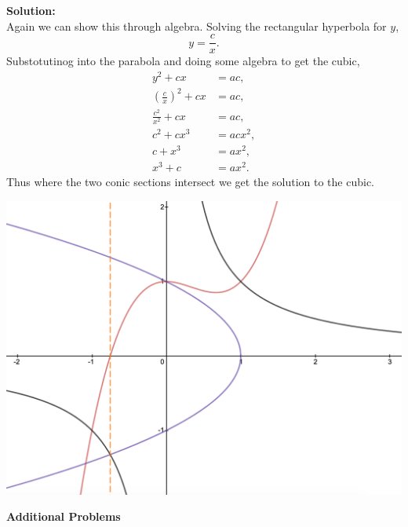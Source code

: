 \documentclass[12pt]{article}
\makeatletter
\theoremstyle{homework}
\newenvironment{exercise}[1]
{\def\@currentlabel{#1}\exercisecore}
{\endexercisecore}
\newcommand{\localhead}[1]{\par\smallskip\noindent\textbf{#1}\nobreak\\}%
\newcommand\solution{\localhead{Solution:}}
\makeatother
\begin{document}
\begin{exercise}{7}
\begin{enumerate}
    \solution Again we can show this through algebra. Solving the rectangular hyperbola for $y$,
    \begin{equation*}
      y = \frac{c}{x}.
    \end{equation*}
    Substotutinog into the parabola and doing some algebra to get the cubic,
    \begin{align*}
      y^2 + cx &= ac,\\
      (\frac{c}{x})^2 + cx &= ac,\\
      \frac{c^2}{x^2} + cx &= ac,\\
      c^2 + cx^3 &= acx^2,\\
      c + x^3 &= ax^2,\\
      x^3 + c &= ax^2.
    \end{align*}
    Thus where the two conic sections intersect we get the solution to the cubic. 

    
  \begin{center}
    \includegraphics[width = .90\textwidth]{curve2.png}
  \end{center}  

  \end{enumerate}
\end{exercise}
\vspace{.5in}

\textbf{Additional Problems}
\end{document}
